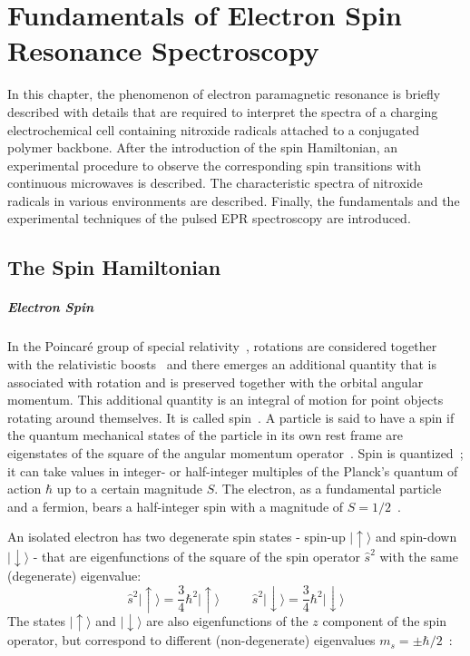 \chapter{Fundamentals of Electron Spin Resonance Spectroscopy}
\label{ch:epr}

In this chapter, the phenomenon of electron paramagnetic resonance is briefly described with details that are required to interpret the spectra of a charging electrochemical cell containing nitroxide radicals attached to a conjugated polymer backbone. After the introduction of the spin Hamiltonian, an experimental procedure to observe the corresponding spin transitions with continuous microwaves is described. The characteristic spectra of nitroxide radicals in various environments are described. Finally, the fundamentals and the experimental techniques of the pulsed EPR spectroscopy are introduced.

\section{The Spin Hamiltonian}
\label{sec:spin}
\paragraph*{Electron Spin}
In the Poincaré group of special relativity~\cite{poincare_1905}, rotations are considered together with the relativistic boosts~\cite{einstein_s_rel} and there emerges an additional quantity that is associated with rotation and is preserved together with the orbital angular momentum. This additional quantity is an integral of motion for point objects rotating around themselves. It is called spin~\cite{kuprov_2023}. A particle is said to have a spin if the quantum mechanical states of the particle in its own rest frame are eigenstates of the square of the angular momentum operator~\cite{Tung_book}. Spin is quantized~\cite{SternGerlach1922}; it can take values in integer- or half-integer multiples of the Planck's quantum of action $\hbar$ up to a certain magnitude $S$. The electron, as a fundamental particle and a fermion, bears a half-integer spin with a magnitude of $S=1/2$~\cite{SternGerlach1922,Sakurai}. 

\par
An isolated electron has two degenerate spin states - spin-up $\vert{\uparrow}\rangle$ and spin-down $\vert{\downarrow}\rangle$ - that are eigenfunctions of the square of the spin operator $\hat{s}^2$ with the same (degenerate) eigenvalue: 
\begin{equation}
\hat{s}^2\vert{\uparrow}\rangle=\frac{3}{4}\hbar^2\vert{\uparrow}\rangle\,\,\,\,\,\,\,\,\,\,\,\,\,\,\
\hat{s}^2\vert{\downarrow}\rangle=\frac{3}{4}\hbar^2\vert{\downarrow}\rangle
\end{equation}
The states $\vert{\uparrow}\rangle$ and $\vert{\downarrow}\rangle$ are also eigenfunctions of the $z$ component of the spin operator, but correspond to different (non-degenerate) eigenvalues $m_s=\pm\hbar/2$~\cite{Sakurai}: 

